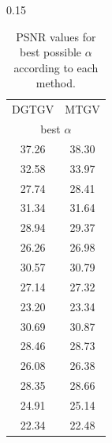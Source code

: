 \documentclass[twocolumn,envcountsame]{svjour3}
\begin{document}
\begin{table}[htb]
\hspace*{-0.35em}
\begin{subtable}[t]{0.15\linewidth}
\setlength\tabcolsep{2pt}
\centering                                                                           
\begin{tabular}{cc}                                                                 
\toprule                                                                             
DGTGV & MTGV \\   
\multicolumn{2}{c}{best $\alpha$}\\                  
\midrule                                                                             
37.26 & 38.30 \\                                                  
32.58 & 33.97 \\                                                   
27.74 & 28.41 \\                                                  
\midrule
31.34 & 31.64 \\                                                     
28.94 & 29.37 \\                                                      
26.26 & 26.98 \\                                                     
\midrule
30.57 & 30.79 \\                                               
27.14 & 27.32 \\                                                 
23.20 & 23.34 \\                                               
\midrule
30.69 & 30.87 \\                                             
28.46 & 28.73 \\                                              
26.08 & 26.38 \\                                             
\midrule
28.35 & 28.66 \\                                                 
24.91 & 25.14 \\                                                   
22.34 & 22.48 \\                                                 
\bottomrule                                                                          
\end{tabular}                                                                        
\caption{PSNR values for best possible $\alpha$ according to each method.}

\end{subtable}
\end{table}
\end{document}
